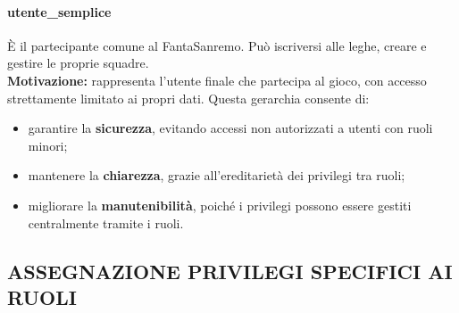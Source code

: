 \documentclass[a4paper]{article}
\begin{document}
\paragraph{utente\_semplice}È il partecipante comune al FantaSanremo. Può iscriversi alle leghe, creare e gestire le proprie squadre.\\
\textbf{Motivazione:}  rappresenta l'utente finale che partecipa al gioco, con accesso strettamente limitato ai propri dati.
\medskip
\noindent
Questa gerarchia consente di:
\begin{itemize}
	\item garantire la \textbf{sicurezza}, evitando accessi non autorizzati a utenti con ruoli minori;
	\item mantenere la \textbf{chiarezza}, grazie all'ereditarietà dei privilegi tra ruoli;
	\item migliorare la \textbf{manutenibilità}, poiché i privilegi possono essere gestiti centralmente tramite i ruoli.
\end{itemize}




\subsection{ASSEGNAZIONE PRIVILEGI SPECIFICI AI RUOLI}
\end{document}
